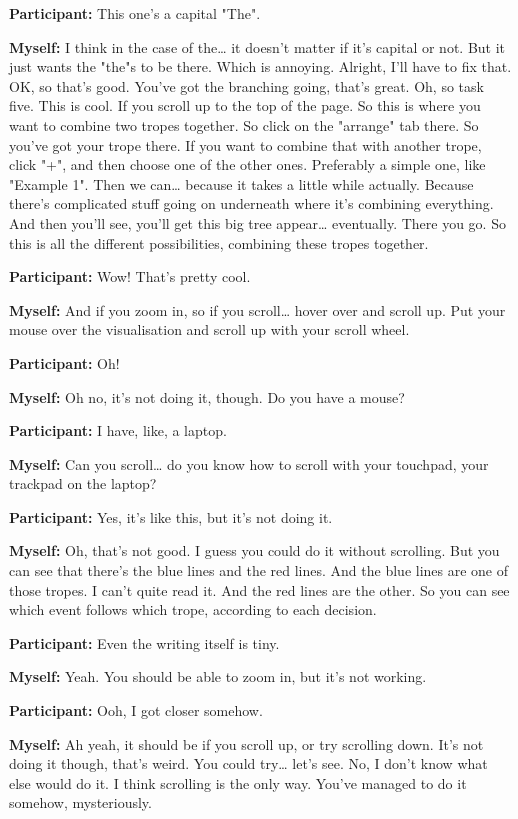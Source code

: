 \documentclass[11pt]{report}
\begin{document}
\begin{linenumbers}
\textbf{Participant:} This one's a capital "The".

\textbf{Myself:} I think in the case of the\ldots{} it doesn't matter if it's
capital or not. But it just wants the "the"s to be there. Which is annoying.
Alright, I'll have to fix that. OK, so that's good. You've got the branching
going, that's great. Oh, so task five. This is cool. If you scroll up to the top
of the page. So this is where you want to combine two tropes together. So click
on the "arrange" tab there. So you've got your trope there. If you want to
combine that with another trope, click "+", and then choose one of the other
ones. Preferably a simple one, like "Example 1". Then we can\ldots{} because it
takes a little while actually. Because there's complicated stuff going on
underneath where it's combining everything. And then you'll see, you'll get this
big tree appear\ldots{} eventually. There you go. So this is all the different
possibilities, combining these tropes together.

\textbf{Participant:} Wow! That's pretty cool.

\textbf{Myself:} And if you zoom in, so if you scroll\ldots{} hover over and scroll up. Put your mouse over the visualisation and scroll up with your scroll wheel.

\textbf{Participant:} Oh!

\textbf{Myself:} Oh no, it's not doing it, though. Do you have a mouse?

\textbf{Participant:} I have, like, a laptop.

\textbf{Myself:} Can you scroll\ldots{} do you know how to scroll with your touchpad, your trackpad on the laptop?

\textbf{Participant:} Yes, it's like this, but it's not doing it.

\textbf{Myself:} Oh, that's not good. I guess you could do it without scrolling. But you can see that there's the blue lines and the red lines. And the blue lines are one of those tropes. I can't quite read it. And the red lines are the other. So you can see which event follows which trope, according to each decision.

\textbf{Participant:} Even the writing itself is tiny.

\textbf{Myself:} Yeah. You should be able to zoom in, but it's not working.

\textbf{Participant:} Ooh, I got closer somehow.

\textbf{Myself:} Ah yeah, it should be if you scroll up, or try scrolling down. It's not doing it though, that's weird. You could try\ldots{} let's see. No, I don't know what else would do it. I think scrolling is the only way. You've managed to do it somehow, mysteriously.


\end{linenumbers}
\end{document}
